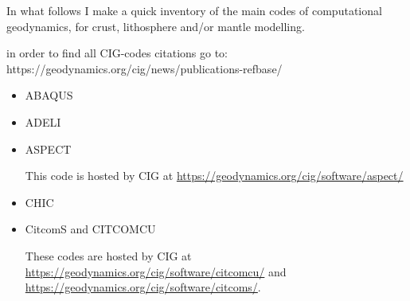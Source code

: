 
In what follows I make a quick inventory of the main codes of computational geodynamics, 
for crust, lithosphere and/or mantle modelling.

in order to find all CIG-codes citations go to: https://geodynamics.org/cig/news/publications-refbase/

\begin{itemize}

\item ABAQUS
\cite{gedh02}
\cite{kuhe09}
\cite{makh09}
\cite{nalr12}
\cite{pevp15}


\item ADELI
\cite{hajc97}
\cite{vech06} 
\cite{boht08a}
\cite{boht08b}
\cite{gech12}
\cite{gigh12}
\cite{wahd13}
\cite{ceag15}
\cite{cegm18}

\item ASPECT

This code is hosted by CIG at \url{https://geodynamics.org/cig/software/aspect/}

\cite{bahk07}
\cite{krhb12}
\cite{aupm15}
\cite{tosn15}
\cite{dahe16}
\cite{gadb16}
\cite{zhon16}
\cite{hepb17}
\cite{daef17}
\cite{hedg17}
\cite{robh17}
\cite{robu17}
\cite{aumh17}
\cite{thie17}
\cite{brsg17}
\cite{onmz17}
\cite{tasm17}
\cite{zhli17}
\cite{daga18}
\cite{onzh18}
\cite{gltf18}
\cite{heps18}
\cite{galh18}
\cite{peka18}
\cite{puth18}
\cite{brst18b}
\cite{baba19}
\cite{stbl19}
\cite{cocf19}
\cite{liki19}

\item CHIC \cite{norv15}

\item CitcomS and CITCOMCU

These codes are hosted by CIG at \url{https://geodynamics.org/cig/software/citcomcu/}
and \url{https://geodynamics.org/cig/software/citcoms/}.


\end{itemize}
